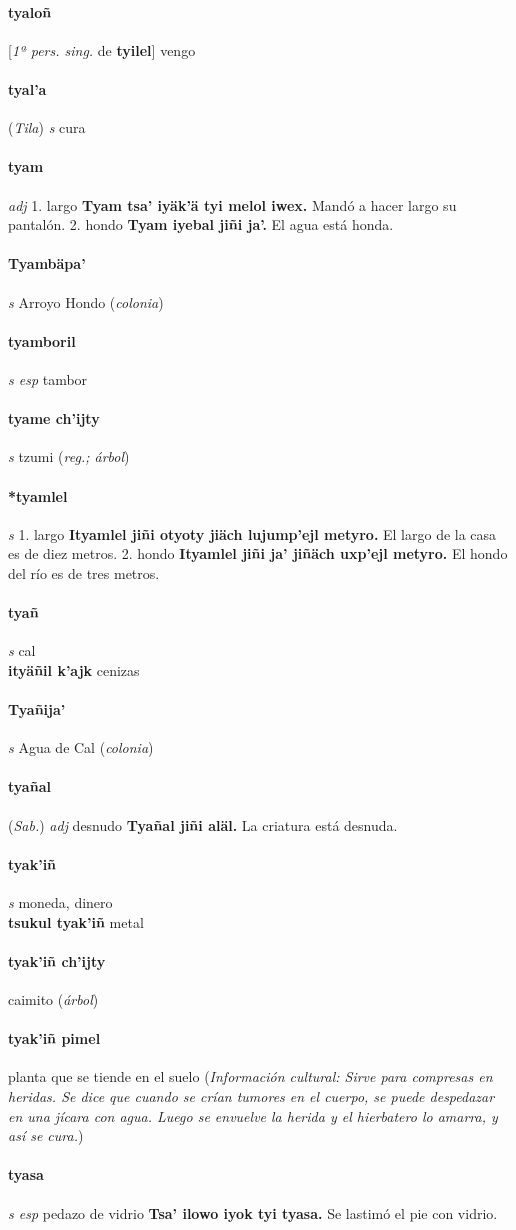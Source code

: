 \documentclass{scrbook}
\newcommand{\entry}[1]{\paragraph{#1}}
\newcommand{\onedefinition}[1]{#1.}
\newcommand{\partofspeech}[1]{\textit{#1}}
\newcommand{\spanishtranslation}[1]{#1}
\newcommand{\clarification}[1]{(\textit{#1})}
\newcommand{\cholexample}[1]{\textbf{#1}}
\newcommand{\exampletranslation}[1]{#1}
\newcommand{\relevantdialect}[1]{(\textit{#1})}
\newcommand{\culturalinformation}[1]{(\textit{#1})}
\newcommand{\secondaryentry}[1]{\\\textbf{#1}}
\newcommand{\secondtranslation}[1]{#1}
\newcommand{\conjugationtense}[1]{[\textit{#1}}
\newcommand{\conjugationverb}[1]{de \textbf{#1}]}
\begin{document}
\begin{multicols}{2}
\entry{tyaloñ}
\conjugationtense{1ª pers. sing.}
\conjugationverb{tyilel}
\spanishtranslation{vengo}

\entry{tyal'a}
\relevantdialect{Tila}
\partofspeech{s}
\spanishtranslation{cura}

\entry{tyam}
\partofspeech{adj}
\onedefinition{1}
\spanishtranslation{largo}
\cholexample{Tyam tsa' iyäk'ä tyi melol iwex.}
\exampletranslation{Mandó a hacer largo su pantalón.}
\onedefinition{2}
\spanishtranslation{hondo}
\cholexample{Tyam iyebal jiñi ja'.}
\exampletranslation{El agua está honda.}

\entry{Tyambäpa'}
\partofspeech{s}
\spanishtranslation{Arroyo Hondo}
\clarification{colonia}

\entry{tyamboril}
\partofspeech{s esp}
\spanishtranslation{tambor}

\entry{tyame ch'ijty}
\partofspeech{s}
\spanishtranslation{tzumi}
\clarification{reg.; árbol}

\entry{*tyamlel}
\partofspeech{s}
\onedefinition{1}
\spanishtranslation{largo}
\cholexample{Ityamlel jiñi otyoty jiäch lujump'ejl metyro.}
\exampletranslation{El largo de la casa es de diez metros.}
\onedefinition{2}
\spanishtranslation{hondo}
\cholexample{Ityamlel jiñi ja' jiñäch uxp'ejl metyro.}
\exampletranslation{El hondo del río es de tres metros.}

\entry{tyañ}
\partofspeech{s}
\spanishtranslation{cal}
\secondaryentry{ityäñil k'ajk}
\secondtranslation{cenizas}

\entry{Tyañija'}
\partofspeech{s}
\spanishtranslation{Agua de Cal}
\clarification{colonia}

\entry{tyañal}
\relevantdialect{Sab.}
\partofspeech{adj}
\spanishtranslation{desnudo}
\cholexample{Tyañal jiñi aläl.}
\exampletranslation{La criatura está desnuda.}

\entry{tyak'iñ}
\partofspeech{s}
\spanishtranslation{moneda, dinero}
\secondaryentry{tsukul tyak'iñ}
\secondtranslation{metal}

\entry{tyak'iñ ch'ijty}
\spanishtranslation{caimito}
\clarification{árbol}

\entry{tyak'iñ pimel}
\spanishtranslation{planta que se tiende en el suelo}
\culturalinformation{Información cultural: Sirve para compresas en heridas. Se dice que cuando se crían tumores en el cuerpo, se puede despedazar en una jícara con agua. Luego se envuelve la herida y el hierbatero lo amarra, y así se cura.}

\entry{tyasa}
\partofspeech{s esp}
\spanishtranslation{pedazo de vidrio}
\cholexample{Tsa' ilowo iyok tyi tyasa.}
\exampletranslation{Se lastimó el pie con vidrio.}


\end{multicols}
\end{document}
